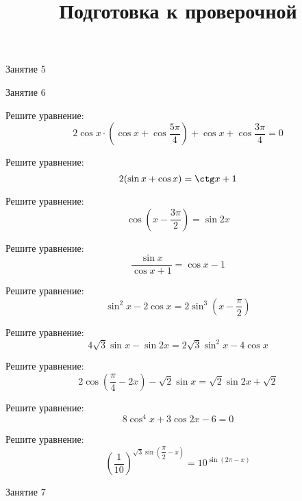 \begin{class}[number=5]
	\begin{listofex}
		\item Занятие 5
	\end{listofex}
\end{class}

\begin{class}[number=6]
	\begin{listofex}
		\item Занятие 6
	\end{listofex}
\end{class}

\begin{homework}[number=3]
	\begin{listofex}
		\item Решите уравнение:
		\[2\cos x\cdot\left( \cos x+\cos\dfrac{5\pi}{4} \right)+\cos x+\cos\dfrac{3\pi}{4}=0\]
		\item Решите уравнение:
		\[2(\sin x+\cos x)=\ctg x+1\]
		\item Решите уравнение:
		\[\cos\left( x-\dfrac{3\pi}{2} \right)=\sin2x\]
		\item Решите уравнение:
		\[\dfrac{\sin x}{\cos x+1}=\cos x-1\]
		\item Решите уравнение:
		\[\sin^2x-2\cos x=2\sin^3\left( x-\dfrac{\pi}{2} \right)\]
		\item Решите уравнение:
		\[4\sqrt{3}\sin x-\sin2x=2\sqrt{3}\sin^2x-4\cos x\]
		\item Решите уравнение:
		\[2\cos\left( \dfrac{\pi}{4}-2x \right)-\sqrt{2}\sin x=\sqrt{2}\sin2x+\sqrt{2}\]
		\item Решите уравнение:
		\[8\cos^4x+3\cos2x-6=0\]
		\item Решите уравнение:
		\[\left( \frac{1}{10} \right)^{\sqrt{3}\sin\left( \dfrac{\pi}{2}-x \right)}=10^{\sin(2\pi-x)}\]
	\end{listofex}
\end{homework}

\begin{class}[number=7]
	\title{Подготовка к проверочной}
	\begin{listofex}
		\item Занятие 7
	\end{listofex}
\end{class}

